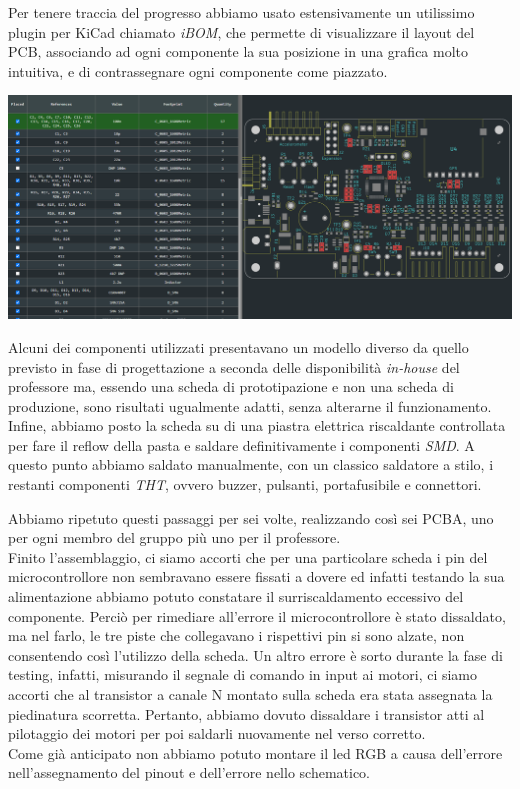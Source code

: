 \noindent Per tenere traccia del progresso abbiamo usato estensivamente un utilissimo plugin per KiCad chiamato \textit{iBOM}, che permette di visualizzare il layout del PCB, associando ad ogni componente la sua posizione in una grafica molto intuitiva, e di contrassegnare ogni componente come piazzato.

\begin{center}
    \includegraphics[width=\textwidth]{figures/image108.png}
    \captionsetup{type=figure}
\end{center}

\noindent Alcuni dei componenti utilizzati presentavano un modello diverso da quello previsto in fase di progettazione a seconda delle disponibilità\textit{ in-house }del professore ma, essendo una scheda di prototipazione e non una scheda di produzione, sono risultati ugualmente adatti, senza alterarne il funzionamento. Infine, abbiamo posto la scheda su di una piastra elettrica riscaldante controllata per fare il reflow della pasta e saldare definitivamente i componenti \textit{SMD}. A questo punto abbiamo saldato manualmente, con un classico saldatore a stilo, i restanti componenti \textit{THT}, ovvero buzzer, pulsanti, portafusibile e connettori.

\noindent Abbiamo ripetuto questi passaggi per sei volte, realizzando così sei PCBA, uno per ogni membro del gruppo più uno per il professore.\\
Finito l’assemblaggio, ci siamo accorti che per una particolare scheda i pin del microcontrollore non sembravano 
essere fissati a dovere ed infatti testando la sua alimentazione abbiamo potuto constatare il surriscaldamento eccessivo 
del componente. Perciò per rimediare all’errore il microcontrollore è stato dissaldato, ma nel farlo, le tre piste che collegavano 
i rispettivi pin si sono alzate, non consentendo così l’utilizzo della scheda. Un altro errore è sorto durante la fase di testing, 
infatti, misurando il segnale di comando in input ai motori, ci siamo accorti che al transistor a canale N montato sulla scheda era 
stata assegnata la piedinatura scorretta. Pertanto, abbiamo dovuto dissaldare i transistor atti al pilotaggio dei motori per poi 
saldarli nuovamente nel verso corretto.\\
Come già anticipato non abbiamo potuto montare il led RGB a causa dell'errore nell'assegnamento del pinout e dell'errore nello schematico.